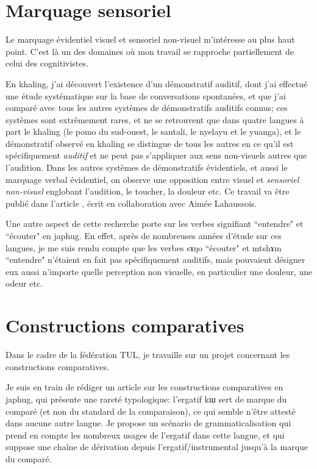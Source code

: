 \documentclass[oldfontcommands,oneside,a4paper,11pt]{memoir}
\newcommand{\ipa}[1]{{\phon #1}} %
\begin{document}
\section{Marquage sensoriel}
Le marquage évidentiel visuel et sensoriel non-visuel m'intéresse au plus haut point. C'est là un des domaines où mon travail se rapproche partiellement de celui des cognitivistes.

En khaling, j'ai découvert l'existence d'un démonstratif auditif, dont j'ai effectué une étude systématique sur la base de conversations spontanées, et que j'ai comparé avec tous les autres systèmes de démonstratifs auditifs connus; ces systèmes sont extrêmement rares, et ne se retrouvent que dans quatre langues à part le khaling (le pomo du sud-ouest, le santali, le nyelayu et le yuanga), et le démonstratif observé en khaling se distingue de tous les autres en ce qu'il est spécifiquement \textit{auditif} et ne peut pas s'appliquer aux sens non-visuels autres que l'audition. Dans les autres systèmes de démonstratifs évidentiels, et aussi le marquage verbal évidentiel, on observe une opposition entre visuel et \textit{sensoriel non-visuel} englobant l'audition, le toucher, la douleur etc.
Ce travail va être publié dans l'article \citet{jacques14auditory}, écrit en collaboration avec Aimée Lahaussois.

Une autre aspect de cette recherche porte sur les verbes signifiant ``entendre" et ``écouter" en japhug. En effet, après de nombreuses années d'étude sur ces langues, je me suis rendu compte que les verbes \ipa{sɤŋo} ``écouter" et \ipa{mtshɤm} ``entendre" n'étaient en fait pas spécifiquement auditifs, mais pouvaient désigner eux aussi n'importe quelle perception non visuelle, en particulier une douleur, une odeur etc.


\section{Constructions comparatives}
Dans le cadre de la fédération TUL, je travaille sur un projet concernant les constructions comparatives. 

Je suis en train de rédiger un article sur les constructions comparatives en japhug, qui présente une rareté typologique: l'ergatif \ipa{kɯ} sert de marque du comparé (et non du standard de la comparaison), ce qui semble n'être attesté dans aucune autre langue. Je propose un scénario de grammaticalisation qui prend en compte les nombreux usages de l'ergatif dans cette langue, et qui suppose une chaîne de dérivation depuis l'ergatif/instrumental jusqu'à la marque du comparé.
\end{document}
